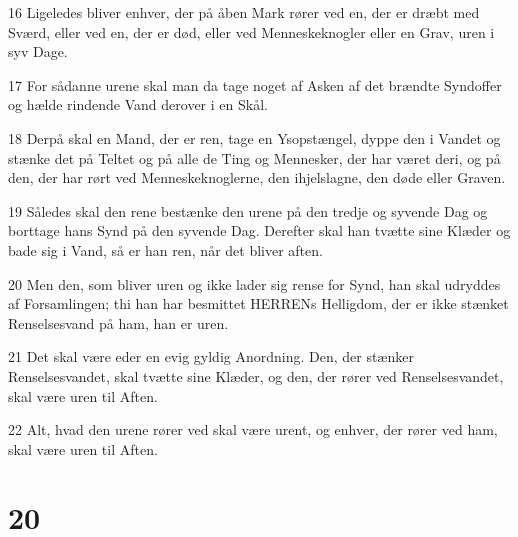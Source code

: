 \par 16 Ligeledes bliver enhver, der på åben Mark rører ved en, der er dræbt med Sværd, eller ved en, der er død, eller ved Menneskeknogler eller en Grav, uren i syv Dage.
\par 17 For sådanne urene skal man da tage noget af Asken af det brændte Syndoffer og hælde rindende Vand derover i en Skål.
\par 18 Derpå skal en Mand, der er ren, tage en Ysopstængel, dyppe den i Vandet og stænke det på Teltet og på alle de Ting og Mennesker, der har været deri, og på den, der har rørt ved Menneskeknoglerne, den ihjelslagne, den døde eller Graven.
\par 19 Således skal den rene bestænke den urene på den tredje og syvende Dag og borttage hans Synd på den syvende Dag. Derefter skal han tvætte sine Klæder og bade sig i Vand, så er han ren, når det bliver aften.
\par 20 Men den, som bliver uren og ikke lader sig rense for Synd, han skal udryddes af Forsamlingen; thi han har besmittet HERRENs Helligdom, der er ikke stænket Renselsesvand på ham, han er uren.
\par 21 Det skal være eder en evig gyldig Anordning. Den, der stænker Renselsesvandet, skal tvætte sine Klæder, og den, der rører ved Renselsesvandet, skal være uren til Aften.
\par 22 Alt, hvad den urene rører ved skal være urent, og enhver, der rører ved ham, skal være uren til Aften.

\chapter{20}


